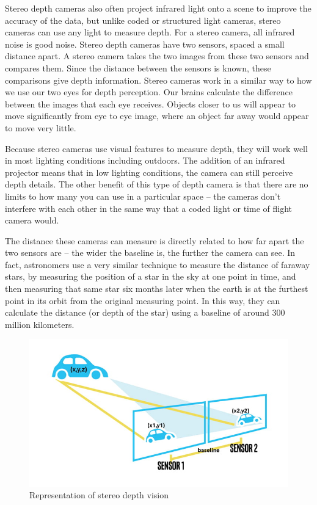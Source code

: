 \documentclass{article}
\begin{document}
Stereo depth cameras also often project infrared light onto a scene to improve the accuracy of the data, but unlike coded or structured light cameras, stereo cameras can use any light to measure depth. For a stereo camera, all infrared noise is good noise. Stereo depth cameras have two sensors, spaced a small distance apart. A stereo camera takes the two images from these two sensors and compares them. Since the distance between the sensors is known, these comparisons give depth information. Stereo cameras work in a similar way to how we use our two eyes for depth perception. Our brains calculate the difference between the images that each eye receives. Objects closer to us will appear to move significantly from eye to eye image, where an object far away would appear to move very little.

Because stereo cameras use visual features to measure depth, they will work well in most lighting conditions including outdoors. The addition of an infrared projector means that in low lighting conditions, the camera can still perceive depth details. The other benefit of this type of depth camera is that there are no limits to how many you can use in a particular space – the cameras don’t interfere with each other in the same way that a coded light or time of flight camera would.

The distance these cameras can measure is directly related to how far apart the two sensors are – the wider the baseline is, the further the camera can see. In fact, astronomers use a very similar technique to measure the distance of faraway stars, by measuring the position of a star in the sky at one point in time, and then measuring that same star six months later when the earth is at the furthest point in its orbit from the original measuring point. In this way, they can calculate the distance (or depth of the star) using a baseline of around 300 million kilometers.

\begin{figure}[h] %
	\centering
	\includegraphics[width=1\columnwidth]{report1-img002.png} %
	\caption{Representation of stereo depth vision}
\end{figure}
\end{document}
